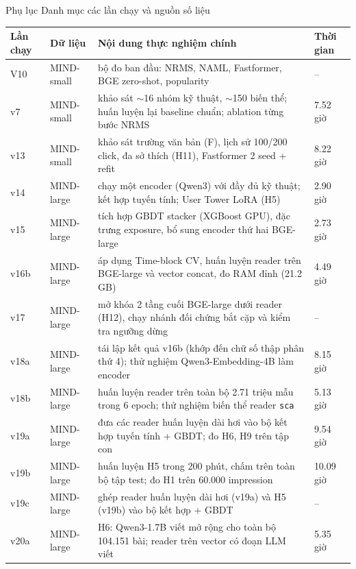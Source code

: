 \documentclass[aspectratio=169,t]{beamer}
\newcommand{\code}[1]{\texttt{#1}}
\begin{document}
\begin{frame}[shrink]{Phụ lục \textperiodcentered{} Danh mục các lần chạy và nguồn số liệu}
\scriptsize
\renewcommand{\arraystretch}{1.18}
\begin{tabularx}{\textwidth}{@{}llYl@{}}
\toprule
\textbf{Lần chạy} & \textbf{Dữ liệu} & \textbf{Nội dung thực nghiệm chính} & \textbf{Thời gian}\\
\midrule
V10 & MIND-small & bộ đo ban đầu: NRMS, NAML, Fastformer, BGE zero-shot, popularity & --\\
v7 & MIND-small & khảo sát $\sim$16 nhóm kỹ thuật, $\sim$150 biến thể; huấn luyện lại baseline chuẩn; ablation từng bước NRMS & 7.52 giờ\\
v13 & MIND-small & khảo sát trường văn bản (F), lịch sử 100/200 click, đa sở thích (H11), Fastformer 2 seed + refit & 8.22 giờ\\
v14 & MIND-large & chạy một encoder (Qwen3) với đầy đủ kỹ thuật; kết hợp tuyến tính; User Tower LoRA (H5) & 2.90 giờ\\
v15 & MIND-large & tích hợp GBDT stacker (XGBoost GPU), đặc trưng exposure, bổ sung encoder thứ hai BGE-large & 2.73 giờ\\
v16b & MIND-large & áp dụng Time-block CV, huấn luyện reader trên BGE-large và vector concat, đo RAM đỉnh (21.2 GB) & 4.49 giờ\\
v17 & MIND-large & mở khóa 2 tầng cuối BGE-large dưới reader (H12), chạy nhánh đối chứng bắt cặp và kiểm tra ngưỡng dừng & --\\
v18a & MIND-large & tái lập kết quả v16b (khớp đến chữ số thập phân thứ 4); thử nghiệm Qwen3-Embedding-4B làm encoder & 8.15 giờ\\
v18b & MIND-large & huấn luyện reader trên toàn bộ 2.71 triệu mẫu trong 6 epoch; thử nghiệm biến thể reader \code{sca} & 5.13 giờ\\
v19a & MIND-large & đưa các reader huấn luyện dài hơi vào bộ kết hợp tuyến tính + GBDT; đo H6, H9 trên tập con & 9.54 giờ\\
v19b & MIND-large & huấn luyện H5 trong 200 phút, chấm trên toàn bộ tập test; đo H1 trên 60.000 impression & 10.09 giờ\\
v19c & MIND-large & ghép reader huấn luyện dài hơi (v19a) và H5 (v19b) vào bộ kết hợp + GBDT & --\\
v20a & MIND-large & H6: Qwen3-1.7B viết mở rộng cho toàn bộ 104.151 bài; reader trên vector có đoạn LLM viết & 5.35 giờ\\

\end{tabularx}
\end{frame}
\end{document}
